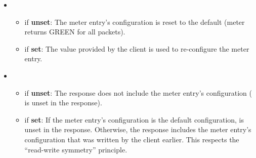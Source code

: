 \documentclass[11pt]{article}
\begin{document}
{\begin{itemize}
\begin{itemize}[noitemsep,topsep=\mdcompacttopsep]
\begin{itemize}[noitemsep,topsep=\mdcompacttopsep]
\item{}if \textbf{unset}: The initial configuration for the meter entry is the
default (meter returns GREEN for all packets).%

\item{}if \textbf{set}: The initial configuration for the meter entry is the one
provided by the client.%
\end{itemize}%

\item{}

\begin{itemize}[noitemsep,topsep=\mdcompacttopsep]%

\item{}if \textbf{unset}: The meter entry's configuration is reset to the default
(meter returns GREEN for all packets).%

\item{}if \textbf{set}: The value provided by the client is used to re-configure
the meter entry.%
\end{itemize}%

\item{}

\begin{itemize}[noitemsep,topsep=\mdcompacttopsep]%

\item{}if \textbf{unset}: The response does not include the meter entry's
configuration ( is unset in the response).%

\item{}if \textbf{set}: If the meter entry's configuration is the default
configuration,  is unset in the response. Otherwise, the
response includes the meter entry's configuration that was written by
the client earlier. This respects the \textquotedblleft{}read-write symmetry\textquotedblright{} principle.%
\end{itemize}%
\end{itemize}%


\end{itemize}}
\end{document}
